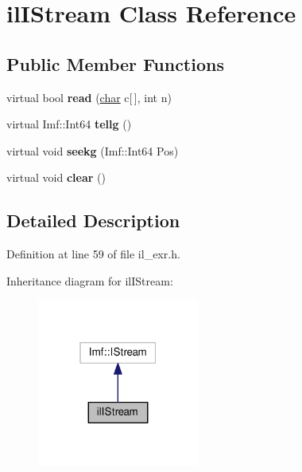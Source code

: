 \hypertarget{classilIStream}{}\section{il\+I\+Stream Class Reference}
\label{classilIStream}
\subsection*{Public Member Functions}
\begin{DoxyCompactItemize}
\item 
\mbox{\label{classilIStream_a05176ebbd3d8ba512188f96c48e4bb59}} 
virtual bool {\bfseries read} (\hyperlink{classchar}{char} c\mbox{[}$\,$\mbox{]}, int n)
\item 
\mbox{\label{classilIStream_ac7858079857f752400aae27559f4fa54}} 
virtual Imf\+::\+Int64 {\bfseries tellg} ()
\item 
\mbox{\label{classilIStream_ab68abd894cce82eeac42b2a46d260148}} 
virtual void {\bfseries seekg} (Imf\+::\+Int64 Pos)
\item 
\mbox{\label{classilIStream_a63ac99be5d2addc64a715a779bd486e8}} 
virtual void {\bfseries clear} ()
\end{DoxyCompactItemize}


\subsection{Detailed Description}


Definition at line 59 of file il\+\_\+exr.\+h.



Inheritance diagram for il\+I\+Stream\+:
\nopagebreak
\begin{figure}[H]
\begin{center}
\leavevmode
\includegraphics[width=151pt]{d2/d0a/classilIStream__inherit__graph}
\end{center}
\end{figure}


